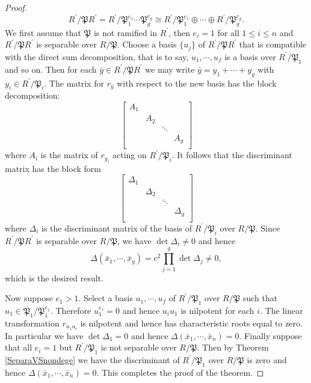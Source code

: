 \begin{proof}
$$
R^{\prime}/\mathfrak{P} R^{\prime}=R^{\prime}/\mathfrak{P} _{1}^{e_1}\cdots \mathfrak{P} _{g}^{e_g}\cong R^{\prime}/\mathfrak{P} _{1}^{e_1}\oplus \cdots \oplus R^{\prime}/\mathfrak{P} _{g}^{e_g}.
$$
We first assume that $\mathfrak{P}$ is not ramified in $R^\prime$, then $e_i=1$ for all $1\le i\le n$ and $R^\prime/\mathfrak{P}R^\prime$ is separable over $R/\mathfrak{P}$. Choose a basis $\{u_j\}$ of $R^\prime/\mathfrak{P}R^\prime$ that is compatible with the direct sum decomposition, that is to say, $u_1,\cdots,u_f$ is a basis over $R^\prime/\mathfrak{P}_1$ and so on. Then for each $\bar{y}\in R^\prime/\mathfrak{P}R^\prime$ we may write $\bar{y}=y_1+\cdots+y_g$ with $y_i\in R^\prime/\mathfrak{P}_i$. The matrix for $r_{\bar{y}}$ with respect to the new basis has the block decomposition: 
$$
\left[ \begin{matrix}
	A_1&		&		&		\\
	&		A_2&		&		\\
	&		&		\ddots&		\\
	&		&		&		A_g\\
\end{matrix} \right] 
$$
where $A_i$ is the matrix of $r_{y_i}$ acting on $R^\prime/\mathfrak{P}_i$. It follows that the discriminant matrix has the block form 
$$
\left[ \begin{matrix}
	\Delta _1&		&		&		\\
	&		\Delta _2&		&		\\
	&		&		\ddots&		\\
	&		&		&		\Delta _g\\
\end{matrix} \right] 
$$
where $\Delta_i$ is the discriminant matrix of the basis of $R^\prime/\mathfrak{P}_i$ over $R/\mathfrak{P}$. Since $R^\prime/\mathfrak{P}R^\prime$ is separable over $R/\mathfrak{P}$, we have $\det\Delta_i\ne 0$ and hence 
$$
\Delta \left( \bar{x}_1,\cdots ,\bar{x}_g \right) =c^2\prod_{j=1}^g{\det \Delta _j}\ne 0,
$$
which is the desired result.\par
Now suppose $e_1>1$. Select a basis $u_1,\cdots,u_f$ of $R^\prime/\mathfrak{P}_1$ over $R/\mathfrak{P}$ such that $u_1\in\mathfrak{P}_1/\mathfrak{P}_1^{e_1}$. Therefore $u_1^{e_1}=0$ and hence $u_iu_1$ is nilpotent for each $i$. The linear transformation $r_{u_1u_i}$ is nilpotent and hence has characteristic roots equal to zero. In particular we have $\det\Delta_1=0$ and hence $\Delta(\bar{x}_1,\cdots,\bar{x}_n)=0$. Finally suppose that all $e_i=1$ but $R^\prime/\mathfrak{P}_1$ is not separable over $R/\mathfrak{P}$. Then by Theorem \ref{SeparaVSnondege} we have the discriminant of $R^\prime/\mathfrak{P}_1$ over $R/\mathfrak{P}$ is zero and hence $\Delta(\bar{x}_1,\cdots,\bar{x}_n)=0$. This completes the proof of the theorem.
\end{proof}
